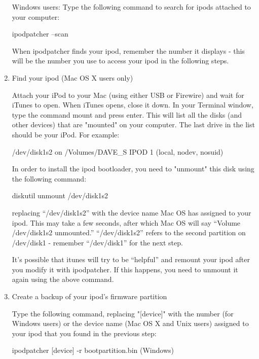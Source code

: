\begin{enumerate}
    Windows users:  Type the following command to search for ipods attached to 
    your computer: 
      \begin{code} 
        ipodpatcher --scan 
      \end{code}
    
    When ipodpatcher finds your ipod, remember the number it displays - this 
    will  be the number you use to access your ipod in the following steps.


  \item Find your ipod (Mac OS X users only)

    Attach your iPod to your Mac (using either USB or Firewire) and wait for 
    iTunes to open. When iTunes opens, close it down.  In your Terminal window, 
    type the command mount and press enter. This will list all the disks (and 
    other devices) that are "mounted" on your computer. The last  drive in the 
    list should be your iPod. For example: 
    \begin{code}
       /dev/disk1s2 on /Volumes/DAVE_S IPOD 1 (local, nodev, nosuid) 
    \end{code}

    In order to install the ipod bootloader, you need to "unmount" this disk 
    using the following command: 
      \begin{code} 
        diskutil unmount /dev/disk1s2 
      \end{code}
      
    replacing ``/dev/disk1s2'' with the device name Mac OS has assigned to your
    ipod. This may take a few seconds, after which Mac OS will say ``Volume 
    /dev/disk1s2 unmounted.'' ``/dev/disk1s2'' refers to the second partition on 
    /dev/disk1 - remember   ``/dev/disk1'' for the next step.

    It's possible that itunes will try to be ``helpful'' and remount your ipod 
    after you modify it with ipodpatcher. If this happens, you need to unmount 
    it again using the above command. 
  
  \item Create a backup of your ipod's firmware partition

    Type the following command, replacing "[device]" with the number (for 
    Windows users) or the device name (Mac OS X and Unix users) assigned to 
    your ipod that  you found in the previous step: 
      \begin{code} 
        ipodpatcher [device] -r bootpartition.bin (Windows) 
      \end{code}


\end{enumerate}
